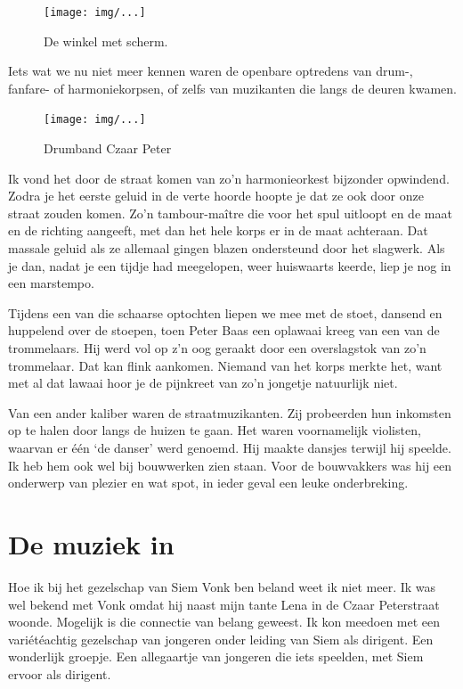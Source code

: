 \documentclass[12pt,twoside]{memoir}
\begin{document}
\begin{figure}[t]
\texttt{[image: img/...]}
\caption{De winkel met scherm.}
\end{figure}

Iets wat we nu niet meer kennen waren de openbare optredens van drum-, fanfare- of harmoniekorpsen, of zelfs van muzikanten die langs de deuren kwamen. 

\begin{figure}[t]
\texttt{[image: img/...]}
\caption{Drumband Czaar Peter}
\end{figure}

Ik vond het door de straat komen van zo’n harmonieorkest bijzonder opwindend. Zodra je het eerste geluid in de verte hoorde hoopte je dat ze ook door onze straat zouden komen. Zo’n tambour-maître die voor het spul uitloopt en de maat en de richting aangeeft, met dan het hele korps er in de maat achteraan. Dat massale geluid als ze allemaal gingen blazen ondersteund door het slagwerk. Als je dan, nadat je een tijdje had meegelopen, weer huiswaarts keerde, liep je nog in een marstempo.

Tijdens een van die schaarse optochten liepen we mee met de stoet, dansend en huppelend over de stoepen, toen Peter Baas een oplawaai kreeg van een van de trommelaars. Hij werd vol op z’n oog geraakt door een overslagstok van zo’n trommelaar. 
Dat kan flink aankomen. Niemand van het korps merkte het, want met al dat lawaai hoor je de pijnkreet van zo’n jongetje natuurlijk niet.

Van een ander kaliber waren de straatmuzikanten. Zij probeerden hun inkomsten op te halen door langs de huizen te gaan. Het waren voornamelijk violisten, waarvan er één ‘de danser’ werd genoemd. Hij maakte dansjes terwijl hij speelde. Ik heb hem ook wel bij bouwwerken zien staan. Voor de bouwvakkers was hij een onderwerp van plezier en wat spot, in ieder geval een leuke onderbreking.

\chapter{De muziek in} %
\label{cha:muziek_in}

Hoe ik bij het gezelschap van Siem Vonk ben beland weet ik niet meer. Ik was wel bekend met Vonk omdat hij naast mijn tante Lena in de Czaar Peterstraat woonde. Mogelijk is die connectie van belang geweest. Ik kon meedoen met een variétéachtig gezelschap van jongeren onder leiding van Siem als dirigent. Een wonderlijk groepje. Een allegaartje van jongeren die iets speelden, met Siem ervoor als dirigent.
\end{document}
